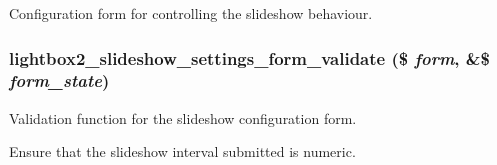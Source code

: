 Configuration form for controlling the slideshow behaviour. \hypertarget{lightbox2_8admin_8inc_5eebf8f7195be0d686e6b4831f35cd1c}{
\subsubsection[{lightbox2\_\-slideshow\_\-settings\_\-form\_\-validate}]{\setlength{\rightskip}{0pt plus 5cm}lightbox2\_\-slideshow\_\-settings\_\-form\_\-validate (\$ {\em form}, \/  \&\$ {\em form\_\-state})}}
\label{lightbox2_8admin_8inc_5eebf8f7195be0d686e6b4831f35cd1c}


Validation function for the slideshow configuration form.

Ensure that the slideshow interval submitted is numeric. 